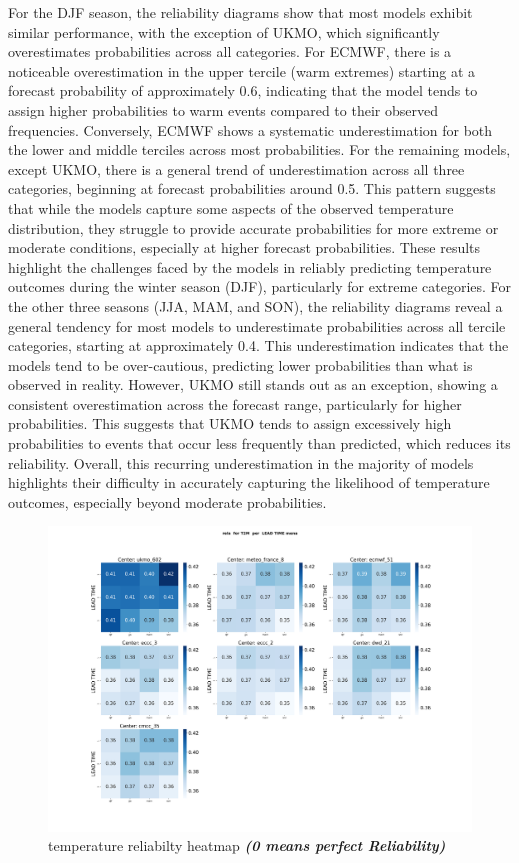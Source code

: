 For the DJF season, the reliability diagrams show that most models exhibit similar performance, with the exception of UKMO, which significantly overestimates probabilities across all categories. For ECMWF, there is a noticeable overestimation in the upper tercile (warm extremes) starting at a forecast probability of approximately 0.6, indicating that the model tends to assign higher probabilities to warm events compared to their observed frequencies. Conversely, ECMWF shows a systematic underestimation for both the lower and middle terciles across most probabilities. For the remaining models, except UKMO, there is a general trend of underestimation across all three categories, beginning at forecast probabilities around 0.5. This pattern suggests that while the models capture some aspects of the observed temperature distribution, they struggle to provide accurate probabilities for more extreme or moderate conditions, especially at higher forecast probabilities. These results highlight the challenges faced by the models in reliably predicting temperature outcomes during the winter season (DJF), particularly for extreme categories.
For the other three seasons (JJA, MAM, and SON), the reliability diagrams reveal a general tendency for most models to underestimate probabilities across all tercile categories, starting at approximately 0.4. This underestimation indicates that the models tend to be over-cautious, predicting lower probabilities than what is observed in reality. However, UKMO still stands out as an exception, showing a consistent overestimation across the forecast range, particularly for higher probabilities. This suggests that UKMO tends to assign excessively high probabilities to events that occur less frequently than predicted, which reduces its reliability. Overall, this recurring underestimation in the majority of models highlights their difficulty in accurately capturing the likelihood of temperature outcomes, especially beyond moderate probabilities. 

\begin{figure}[H]
    \centering
    \includegraphics[width=1\linewidth]{plots/prob/rela/rela_T2M_mena.png}
    \caption{temperature reliabilty heatmap \textbf{\textit{(0 means perfect Reliability)}}}
\end{figure}


